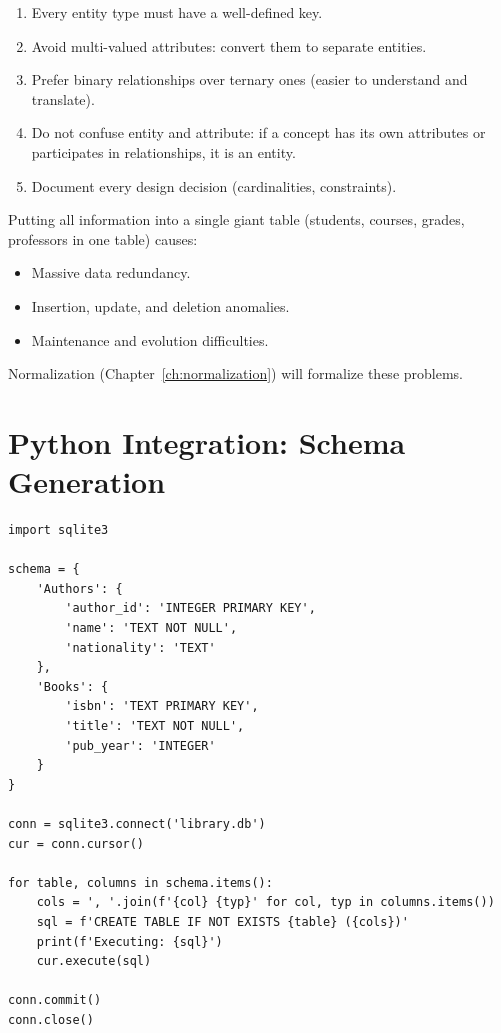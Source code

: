 \begin{bestpractice}[title=\textbf{Golden Rules of ER Design}]
\begin{enumerate}
    \item Every entity type must have a well-defined key.
    \item Avoid multi-valued attributes: convert them to separate entities.
    \item Prefer binary relationships over ternary ones
          (easier to understand and translate).
    \item Do not confuse entity and attribute: if a concept has its own
          attributes or participates in relationships, it is an entity.
    \item Document every design decision (cardinalities, constraints).
\end{enumerate}
\end{bestpractice}

\begin{antipattern}[title=\textbf{Anti-pattern: The ``Mega-Table''}]
Putting all information into a single giant table (students, courses,
grades, professors in one table) causes:
\begin{itemize}
    \item Massive data redundancy.
    \item Insertion, update, and deletion anomalies.
    \item Maintenance and evolution difficulties.
\end{itemize}
Normalization (Chapter~\ref{ch:normalization}) will formalize these problems.
\end{antipattern}

\section{Python Integration: Schema Generation}

\begin{codeblock}[title=\textbf{Automatic Schema Generation with Python}]
\begin{verbatim}
import sqlite3

schema = {
    'Authors': {
        'author_id': 'INTEGER PRIMARY KEY',
        'name': 'TEXT NOT NULL',
        'nationality': 'TEXT'
    },
    'Books': {
        'isbn': 'TEXT PRIMARY KEY',
        'title': 'TEXT NOT NULL',
        'pub_year': 'INTEGER'
    }
}

conn = sqlite3.connect('library.db')
cur = conn.cursor()

for table, columns in schema.items():
    cols = ', '.join(f'{col} {typ}' for col, typ in columns.items())
    sql = f'CREATE TABLE IF NOT EXISTS {table} ({cols})'
    print(f'Executing: {sql}')
    cur.execute(sql)

conn.commit()
conn.close()
\end{verbatim}
\end{codeblock}

